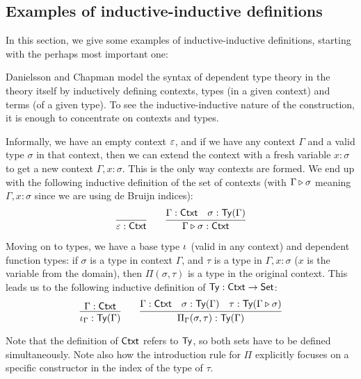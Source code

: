 \documentclass{schwicht}
\begin{document}



\subsection{Examples of inductive-inductive definitions}
\label{sec:examples}

In this section, we give some examples of inductive-inductive
definitions, starting with the perhaps most important one:

\begin{example}
\label{ex:ctxt-type}

Danielsson \cite{danielsson2007formalisation} and Chapman
\cite{chapman2009eatitself} model the syntax of dependent type theory
in the theory itself by inductively defining contexts, types (in a
given context) and terms (of a given type). To see the
inductive-inductive nature of the construction, it is enough to
concentrate on contexts and types.

Informally, we have an empty context $\varepsilon$, and if we have any
context $\Gamma$ and a valid type $\sigma$ in that context, then we
can extend the context with a fresh variable $x : \sigma$ to get a new
context $\Gamma, x : \sigma$. This is the only way contexts are
formed. We end up with the following inductive definition of the set
of contexts (with $\Gamma \triangleright \sigma$ meaning $\Gamma, x :
\sigma$ since we are using de Bruijn indices):
\[
\infer{\emptyCtxt : \Ctxt}{} \qquad
\infer{\consCtxt{\Gamma}{\sigma} : \Ctxt}{\Gamma : \Ctxt & \sigma : \Ty(\Gamma)}
\]

Moving on to types, we have a base type $\iota_{}$ (valid in any
context) and dependent function types: if $\sigma$ is a type in
context $\Gamma$, and $\tau$ is a type in $\Gamma, x : \sigma$ ($x$ is
the variable from the domain), then $\Pi(\sigma, \tau)$ is a type in
the original context. This leads us to the following inductive
definition of $\mathsf{Ty} : \mathsf{Ctxt} \to \mathsf{Set}$:
\[
\infer{\baseTy{\Gamma} : \Ty(\Gamma)}{\Gamma : \Ctxt} \qquad
\infer{\piTy{\Gamma}{\sigma}{\tau} : \Ty(\Gamma)}{\Gamma : \Ctxt
                    & \sigma : \Ty(\Gamma)
                    & \tau : \Ty(\consCtxt{\Gamma}{\sigma})}
\]

Note that the definition of $\mathsf{Ctxt}$ refers to $\mathsf{Ty}$, so both sets have
to be defined simultaneously. Note also how the introduction rule for
$\Pi$ explicitly focuses on a specific constructor in the index of the
type of $\tau$. 
\blackqed
\end{example}
\end{document}
